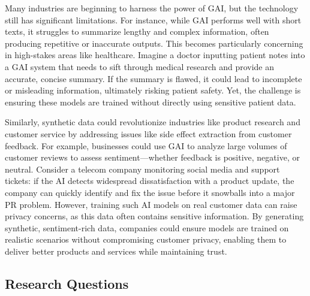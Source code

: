 \documentclass[sigplan,screen]{acmart}
\begin{document}
Many industries are beginning to harness the power of GAI, but the technology still has significant limitations. For instance, while GAI performs well with short texts, it struggles to summarize lengthy and complex information, often producing repetitive or inaccurate outputs. This becomes particularly concerning in high-stakes areas like healthcare. Imagine a doctor inputting patient notes into a GAI system that needs to sift through medical research and provide an accurate, concise summary. If the summary is flawed, it could lead to incomplete or misleading information, ultimately risking patient safety. Yet, the challenge is ensuring these models are trained without directly using sensitive patient data.

Similarly, synthetic data could revolutionize industries like product research and customer service by addressing issues like side effect extraction from customer feedback. For example, businesses could use GAI to analyze large volumes of customer reviews to assess sentiment—whether feedback is positive, negative, or neutral. Consider a telecom company monitoring social media and support tickets: if the AI detects widespread dissatisfaction with a product update, the company can quickly identify and fix the issue before it snowballs into a major PR problem. However, training such AI models on real customer data can raise privacy concerns, as this data often contains sensitive information. By generating synthetic, sentiment-rich data, companies could ensure models are trained on realistic scenarios without compromising customer privacy, enabling them to deliver better products and services while maintaining trust.

\subsection{Research Questions}
\end{document}
